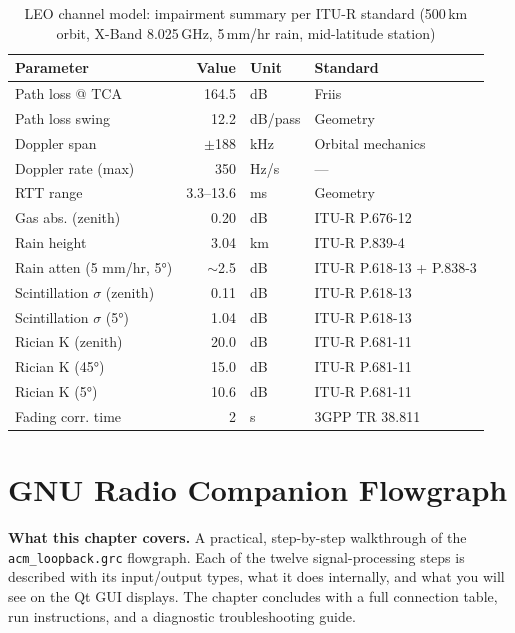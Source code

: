 \documentclass[12pt,a4paper]{report}
\begin{document}
\begin{table}[H]
\centering
\caption{LEO channel model: impairment summary per ITU-R standard
  (500\,km orbit, X-Band 8.025\,GHz, 5\,mm/hr rain, mid-latitude station)}
\label{tab:leo_params}
\begin{tabular}{lrll}
\toprule
\textbf{Parameter}     & \textbf{Value} & \textbf{Unit} & \textbf{Standard} \\
\midrule
Path loss @ TCA        & 164.5 & dB   & Friis \\
Path loss swing        & 12.2  & dB/pass & Geometry \\
Doppler span           & $\pm$188 & kHz & Orbital mechanics \\
Doppler rate (max)     & 350   & Hz/s & --- \\
RTT range              & 3.3--13.6 & ms & Geometry \\
Gas abs. (zenith)      & 0.20  & dB   & ITU-R P.676-12 \\
Rain height            & 3.04  & km   & ITU-R P.839-4 \\
Rain atten (5 mm/hr, 5°) & $\sim$2.5 & dB & ITU-R P.618-13 + P.838-3 \\
Scintillation $\sigma$ (zenith) & 0.11 & dB & ITU-R P.618-13 \\
Scintillation $\sigma$ (5°)     & 1.04 & dB & ITU-R P.618-13 \\
Rician K (zenith)      & 20.0  & dB   & ITU-R P.681-11 \\
Rician K (45°)         & 15.0  & dB   & ITU-R P.681-11 \\
Rician K (5°)          & 10.6  & dB   & ITU-R P.681-11 \\
Fading corr. time      & 2     & s    & 3GPP TR 38.811 \\
\bottomrule
\end{tabular}
\end{table}

\chapter{GNU Radio Companion Flowgraph}

\begin{keyinsight}
\textbf{What this chapter covers.}
A practical, step-by-step walkthrough of the \texttt{acm\_loopback.grc}
flowgraph.  Each of the twelve signal-processing steps is described with
its input/output types, what it does internally, and what you will see on
the Qt GUI displays.  The chapter concludes with a full connection table,
run instructions, and a diagnostic troubleshooting guide.
\end{keyinsight}
\end{document}
